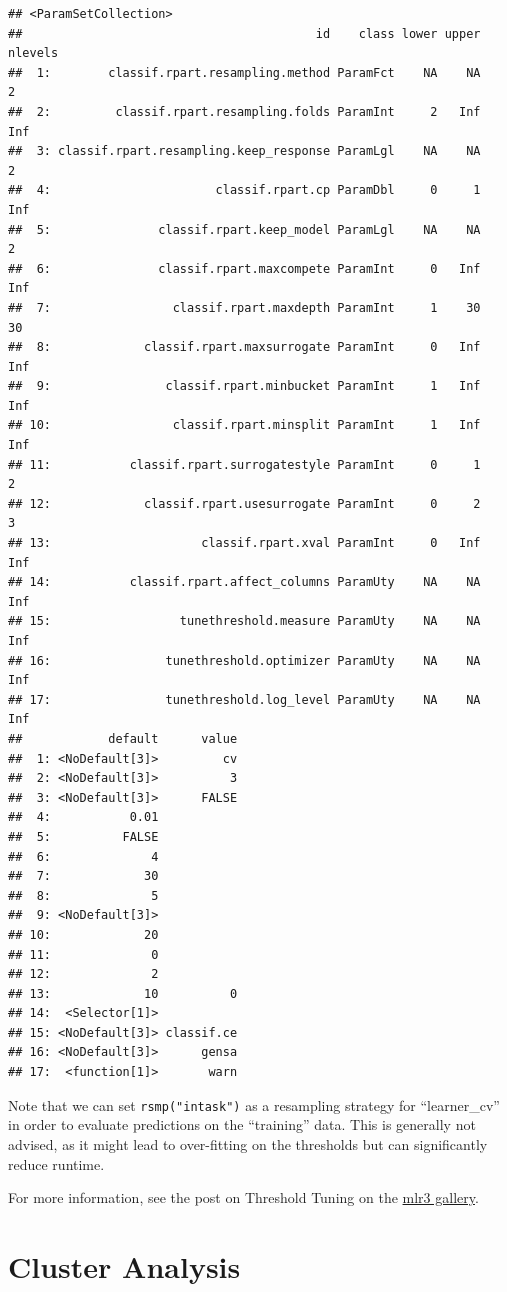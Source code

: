 \documentclass[
]{scrbook}
\begin{document}
\begin{verbatim}
## <ParamSetCollection>
##                                         id    class lower upper nlevels
##  1:        classif.rpart.resampling.method ParamFct    NA    NA       2
##  2:         classif.rpart.resampling.folds ParamInt     2   Inf     Inf
##  3: classif.rpart.resampling.keep_response ParamLgl    NA    NA       2
##  4:                       classif.rpart.cp ParamDbl     0     1     Inf
##  5:               classif.rpart.keep_model ParamLgl    NA    NA       2
##  6:               classif.rpart.maxcompete ParamInt     0   Inf     Inf
##  7:                 classif.rpart.maxdepth ParamInt     1    30      30
##  8:             classif.rpart.maxsurrogate ParamInt     0   Inf     Inf
##  9:                classif.rpart.minbucket ParamInt     1   Inf     Inf
## 10:                 classif.rpart.minsplit ParamInt     1   Inf     Inf
## 11:           classif.rpart.surrogatestyle ParamInt     0     1       2
## 12:             classif.rpart.usesurrogate ParamInt     0     2       3
## 13:                     classif.rpart.xval ParamInt     0   Inf     Inf
## 14:           classif.rpart.affect_columns ParamUty    NA    NA     Inf
## 15:                  tunethreshold.measure ParamUty    NA    NA     Inf
## 16:                tunethreshold.optimizer ParamUty    NA    NA     Inf
## 17:                tunethreshold.log_level ParamUty    NA    NA     Inf
##            default      value
##  1: <NoDefault[3]>         cv
##  2: <NoDefault[3]>          3
##  3: <NoDefault[3]>      FALSE
##  4:           0.01           
##  5:          FALSE           
##  6:              4           
##  7:             30           
##  8:              5           
##  9: <NoDefault[3]>           
## 10:             20           
## 11:              0           
## 12:              2           
## 13:             10          0
## 14:  <Selector[1]>           
## 15: <NoDefault[3]> classif.ce
## 16: <NoDefault[3]>      gensa
## 17:  <function[1]>       warn
\end{verbatim}

Note that we can set \texttt{rsmp("intask")} as a resampling strategy for ``learner\_cv'' in order to evaluate
predictions on the ``training'' data. This is generally not advised, as it might lead to over-fitting
on the thresholds but can significantly reduce runtime.

For more information, see the post on Threshold Tuning on the \href{https://mlr3gallery.mlr-org.com/}{mlr3 gallery}.

\hypertarget{cluster}{%
\section{Cluster Analysis}\label{cluster}}
\end{document}
